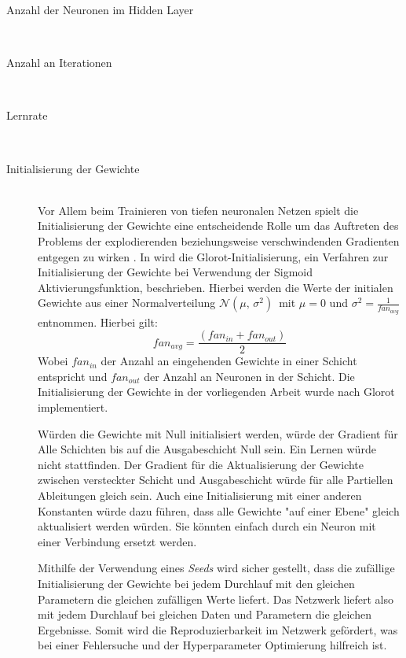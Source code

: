 \begin{description}
	\item[Anzahl der Neuronen im Hidden Layer]\hfill \\
	\item[Anzahl an Iterationen]\hfill \\
	\item[Lernrate]\hfill \\
	\item[Initialisierung der Gewichte]\hfill \\
	Vor Allem beim Trainieren von tiefen neuronalen Netzen spielt die Initialisierung der Gewichte eine entscheidende Rolle um das Auftreten des Problems der explodierenden beziehungsweise verschwindenden Gradienten entgegen zu wirken \cite{geron2017hands-on}. In \cite{Glorot10understandingthe} wird die Glorot-Initialisierung, ein Verfahren zur Initialisierung der Gewichte bei Verwendung der Sigmoid Aktivierungsfunktion, beschrieben. Hierbei werden die Werte der initialen Gewichte aus einer Normalverteilung $\mathcal{N}(\mu,\,\sigma^{2})\,$ mit $\mu = 0$ und $\sigma^{2}=\frac{1}{fan_{avg}}$ entnommen. Hierbei gilt: 
	\[
	fan_{avg}=\frac{(fan_{in}+fan_{out})}{2}
	\]
	Wobei $fan_{in}$ der Anzahl an eingehenden Gewichte in einer Schicht entspricht und  $fan_{out}$ der Anzahl an Neuronen in der Schicht. Die Initialisierung der Gewichte in der vorliegenden Arbeit wurde  nach Glorot implementiert.

	Würden die Gewichte mit Null initialisiert werden, würde der Gradient für Alle Schichten bis auf die Ausgabeschicht Null sein. Ein Lernen würde nicht stattfinden. Der Gradient für die Aktualisierung der Gewichte zwischen versteckter Schicht und Ausgabeschicht würde für alle Partiellen Ableitungen gleich sein. Auch eine Initialisierung mit einer anderen Konstanten würde dazu führen, dass alle Gewichte "auf einer Ebene" gleich aktualisiert werden würden. Sie könnten einfach durch ein Neuron mit einer Verbindung ersetzt werden.
	
	Mithilfe der Verwendung eines \emph{Seeds} wird sicher gestellt, dass die zufällige Initialisierung der Gewichte bei jedem Durchlauf mit den gleichen Parametern die gleichen zufälligen Werte liefert. Das Netzwerk liefert also mit jedem Durchlauf bei gleichen Daten und Parametern die gleichen Ergebnisse. Somit wird die Reproduzierbarkeit im Netzwerk gefördert, was bei einer Fehlersuche und der Hyperparameter Optimierung hilfreich ist.
	
\end{description}
